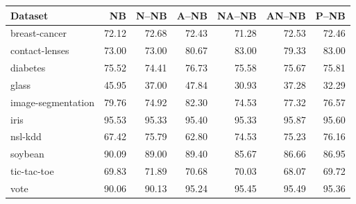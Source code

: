 \begin{tabular}{lrrrrrr}
\toprule
Dataset & NB & N--NB & A--NB & NA--NB & AN--NB & P--NB \\
\midrule
breast-cancer & 72.12 & 72.68 & 72.43 & 71.28 & 72.53 & 72.46 \\
contact-lenses & 73.00 & 73.00 & 80.67 & 83.00 & 79.33 & 83.00 \\
diabetes & 75.52 & 74.41 & 76.73 & 75.58 & 75.67 & 75.81 \\
glass & 45.95 & 37.00 & 47.84 & 30.93 & 37.28 & 32.29 \\
image-segmentation & 79.76 & 74.92 & 82.30 & 74.53 & 77.32 & 76.57 \\
iris & 95.53 & 95.33 & 95.40 & 95.33 & 95.87 & 95.60 \\
nsl-kdd & 67.42 & 75.79 & 62.80 & 74.53 & 75.23 & 76.16 \\
soybean & 90.09 & 89.00 & 89.40 & 85.67 & 86.66 & 86.95 \\
tic-tac-toe & 69.83 & 71.89 & 70.68 & 70.03 & 68.07 & 69.72 \\
vote & 90.06 & 90.13 & 95.24 & 95.45 & 95.49 & 95.36 \\
\bottomrule
\end{tabular}
